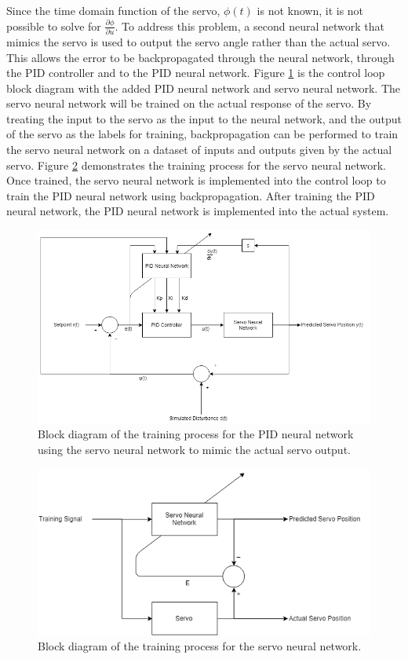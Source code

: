 \documentclass[letterpaper,12pt]{article}
\newcommand{\di}{\partial}
\begin{document}
Since the time domain function of the servo, $\phi(t)$ is not known, it is not possible to solve for $\frac{\di \phi}{\di u}$. To address this problem, a second neural network that mimics the servo is used to output the servo angle rather than the actual servo. This allows the error to be backpropagated through the neural network, through the PID controller and to the PID neural network. Figure \ref{fig:pid_model_free_backprop} is the control loop block diagram with the added PID neural network and servo neural network. The servo neural network will be trained on the actual response of the servo. By treating the input to the servo as the input to the neural network, and the output of the servo as the labels for training, backpropagation can be performed to train the servo neural network on a dataset of inputs and outputs given by the actual servo. Figure \ref{fig:servo_nn_training} demonstrates the training process for the servo neural network. Once trained, the servo neural network is implemented into the control loop to train the PID neural network using backpropagation. After training the PID neural network, the PID neural network is implemented into the actual system.

\begin{figure}[H]
\centering \includegraphics[width=0.8\columnwidth]{pid_model_free_backprop.png}
\caption{\label{fig:pid_model_free_backprop}Block diagram of the training process for the PID neural network using the servo neural network to mimic the actual servo output.}
\end{figure}

\begin{figure}[H]
\centering \includegraphics[width=0.8\columnwidth]{servo_nn_training.png}
\caption{\label{fig:servo_nn_training}Block diagram of the training process for the servo neural network.}
\end{figure}
\end{document}
